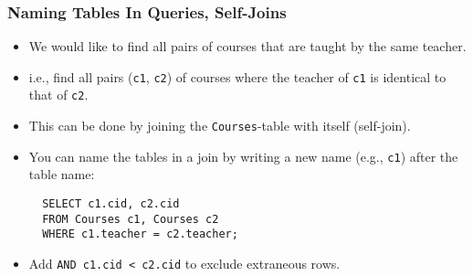 \documentclass[dvipsnames]{beamer}
\begin{document}






\begin{frame}[fragile=singleslide]
\frametitle{Naming Tables In Queries, Self-Joins}

\begin{itemize}
\item We would like to find all pairs of courses that are taught by
  the same teacher.

\item i.e., find all pairs (\texttt{c1}, \texttt{c2}) of courses where
  the teacher of \texttt{c1} is identical to that of \texttt{c2}.
  
\item This can be done by joining the \texttt{Courses}-table with
  itself (self-join).

\item You can name the tables in a join by writing a new name (e.g.,
  \texttt{c1}) after the table name:

\begin{small}
\begin{verbatim}
  SELECT c1.cid, c2.cid 
  FROM Courses c1, Courses c2 
  WHERE c1.teacher = c2.teacher;
\end{verbatim}
\end{small}
    
    
  \item Add \texttt{AND c1.cid < c2.cid} to exclude extraneous rows.
\end{itemize}
\end{frame}


\end{document}
